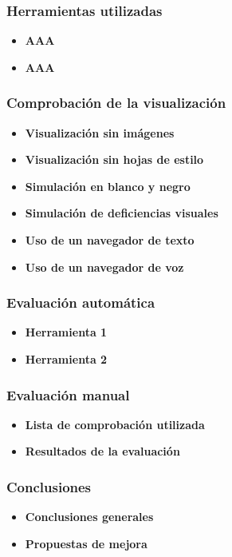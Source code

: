 \documentclass[a4paper,11pt]{article}
\begin{document}
\subsubsection{Herramientas utilizadas}
\begin{itemize}
  \item \textbf{AAA}
  \item \textbf{AAA}
\end{itemize}

\subsubsection{Comprobación de la visualización}
\begin{itemize}
  \item \textbf{Visualización sin imágenes}
  \item \textbf{Visualización sin hojas de estilo}
  \item \textbf{Simulación en blanco y negro}
  \item \textbf{Simulación de deficiencias visuales}
  \item \textbf{Uso de un navegador de texto}
  \item \textbf{Uso de un navegador de voz}
\end{itemize}

\subsubsection{Evaluación automática}
\begin{itemize}
  \item \textbf{Herramienta 1}
  \item \textbf{Herramienta 2}
\end{itemize}

\subsubsection{Evaluación manual}
\begin{itemize}
  \item \textbf{Lista de comprobación utilizada}
  \item \textbf{Resultados de la evaluación}

\end{itemize}

\subsubsection{Conclusiones}
\begin{itemize}
  \item \textbf{Conclusiones generales}
  \item \textbf{Propuestas de mejora}
\end{itemize}
\end{document}
